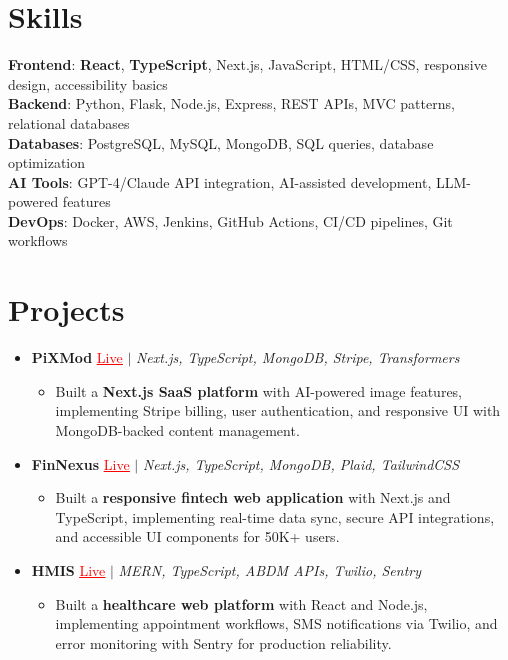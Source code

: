 \documentclass[letterpaper,10pt]{article}
\newcommand{\resumeItem}[1]{\item\small{{#1 \vspace{-2pt}}}}
\newcommand{\resumeProjectHeading}[1]{\item \small #1 \vspace{-2pt}}
\newcommand{\resumeSubHeadingListStart}{\begin{itemize}[leftmargin=0.0in, label={}]}
\newcommand{\resumeSubHeadingListEnd}{\end{itemize}}
\newcommand{\resumeProjItemListStart}{\begin{itemize}[leftmargin=0.15in,label=\textbullet,itemsep=0pt,topsep=0pt,parsep=0pt,partopsep=0pt]}
\newcommand{\resumeProjItemListEnd}{\end{itemize}\vspace{-4pt}}
\begin{document}
\section{Skills}
\begin{itemize}[leftmargin=0.15in, label={}]
\small{\item{
\textbf{Frontend}: \textbf{React}, \textbf{TypeScript}, Next.js, JavaScript, HTML/CSS, responsive design, accessibility basics \\
\textbf{Backend}: Python, Flask, Node.js, Express, REST APIs, MVC patterns, relational databases \\
\textbf{Databases}: PostgreSQL, MySQL, MongoDB, SQL queries, database optimization \\
\textbf{AI Tools}: GPT-4/Claude API integration, AI-assisted development, LLM-powered features \\
\textbf{DevOps}: Docker, AWS, Jenkins, GitHub Actions, CI/CD pipelines, Git workflows
}}
\end{itemize}
\vspace{-16pt}
\section{Projects}
\resumeSubHeadingListStart
\vspace{-2pt}
\resumeProjectHeading{\textbf{PiXMod} {\href{https://pixmod.vercel.app/}{\textcolor{red}{\underline{Live}}}} $|$ \emph{Next.js, TypeScript, MongoDB, Stripe, Transformers}}
\resumeProjItemListStart
\resumeItem{Built a \textbf{Next.js SaaS platform} with AI-powered image features, implementing Stripe billing, user authentication, and responsive UI with MongoDB-backed content management.}
\resumeProjItemListEnd
\vspace{3pt}
\resumeProjectHeading{\textbf{FinNexus} {\href{https://fin-nexus.vercel.app/}{\textcolor{red}{\underline{Live}}}} $|$ \emph{Next.js, TypeScript, MongoDB, Plaid, TailwindCSS}}
\resumeProjItemListStart
\resumeItem{Built a \textbf{responsive fintech web application} with Next.js and TypeScript, implementing real-time data sync, secure API integrations, and accessible UI components for 50K+ users.}
\resumeProjItemListEnd
\vspace{3pt}
\resumeProjectHeading{\textbf{HMIS} {\href{https://hims-rouge.vercel.app/}{\textcolor{red}{\underline{Live}}}} $|$ \emph{MERN, TypeScript, ABDM APIs, Twilio, Sentry}}
\resumeProjItemListStart
\resumeItem{Built a \textbf{healthcare web platform} with React and Node.js, implementing appointment workflows, SMS notifications via Twilio, and error monitoring with Sentry for production reliability.}
\resumeProjItemListEnd
\resumeSubHeadingListEnd
\end{document}
